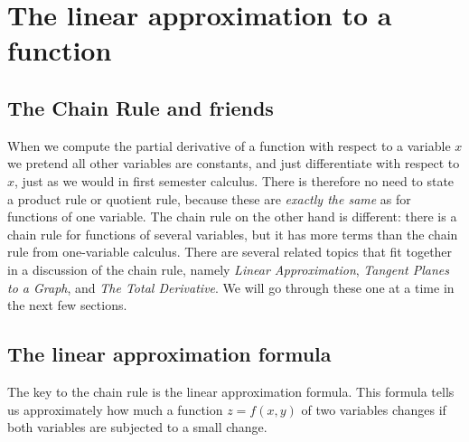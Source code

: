 \section{The linear approximation to a function}
\label{sec:the-linear-approximation-of-a-function}

\subsection{The Chain Rule and friends}     
When we compute the partial derivative of a function with respect to a variable
$x$ we pretend all other variables are constants, and just differentiate with
respect to $x$, just as we would in first semester calculus.  There is therefore
no need to state a product rule or quotient rule, because these are
\textit{exactly the same} as for functions of one variable.  The chain rule on
the other hand is different: there is a chain rule for functions of several
variables, but it has more terms than the chain rule from one-variable calculus.
There are several related topics that fit together in a discussion of the chain
rule, namely \emph{Linear Approximation}, \emph{Tangent Planes to a Graph}, and
\emph{The Total Derivative}.  We will go through these one at a time in the next
few sections.


\subsection{The linear approximation formula}
\label{sec:linear-approximation-no-error}
The key to the chain rule is the linear approximation formula.  This formula
tells us approximately how much a function $z=f(x, y)$ of two variables changes
if both variables are subjected to a small change.

